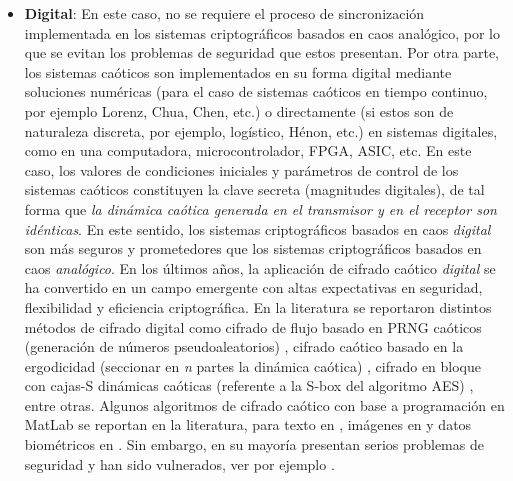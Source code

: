 \begin{itemize}
\item \textbf{Digital}: En este caso, no se requiere el proceso de sincronización implementada en los sistemas criptográficos basados en caos analógico, por lo que se evitan los problemas de seguridad que estos presentan. Por otra parte, los sistemas caóticos son implementados en su forma digital mediante soluciones numéricas (para el caso de sistemas caóticos en tiempo continuo, por ejemplo Lorenz, Chua, Chen, etc.) o directamente (si estos son de naturaleza discreta, por ejemplo, logístico, Hénon, etc.) en sistemas digitales, como en una computadora, microcontrolador, FPGA, ASIC, etc. En este caso, los valores de condiciones iniciales y parámetros de control de los sistemas caóticos constituyen la clave secreta (magnitudes digitales), de tal forma que \textit{la dinámica caótica generada en el transmisor y en el receptor son idénticas}. En este sentido, los sistemas criptográficos basados en caos \textit{digital} son más seguros y prometedores que los sistemas criptográficos basados en caos \textit{analógico}. En los últimos años, la aplicación de cifrado caótico \textit{digital} se ha convertido en un campo emergente con altas expectativas en seguridad, flexibilidad y eficiencia criptográfica. En la literatura se reportaron distintos métodos de cifrado digital como cifrado de flujo basado en PRNG caóticos (generación de números pseudoaleatorios) \cite{YyH_2010, AEtAl_2012, FEtAl_2013}, cifrado caótico basado en la ergodicidad (seccionar en \textit{n} partes la dinámica caótica) \cite{B_1998, WyT_2012}, cifrado en bloque con cajas-S dinámicas caóticas (referente a la S-box del algoritmo AES) \cite{AyJ_2007, HEtAl_2014, ZEtAl_2014a}, entre otras. Algunos algoritmos de cifrado caótico con base a programación en MatLab se reportan en la literatura, para texto en \cite{MyM_2012}, imágenes en \cite{PEtAl_2006, PEtAl_2009, HyX_2010, C_2010, CyC_2011, WEtAl_2012, L_2012, IyC_2013, NEtAl_2014} y datos biométricos en \cite{KEtAl_2007, XEtAl_2011}. Sin embargo, en su mayoría presentan serios problemas de seguridad y han sido vulnerados, ver por ejemplo \cite{WEtAl_2005, WEtAl_2007, ByN_2008, CyS_2009, AyL_2009, LEtAl_2009, REtAl_2010, SEtAl_2010, LEtAl_2011, ZEtAl_2011, LEtAl_2012}.
\end{itemize}

